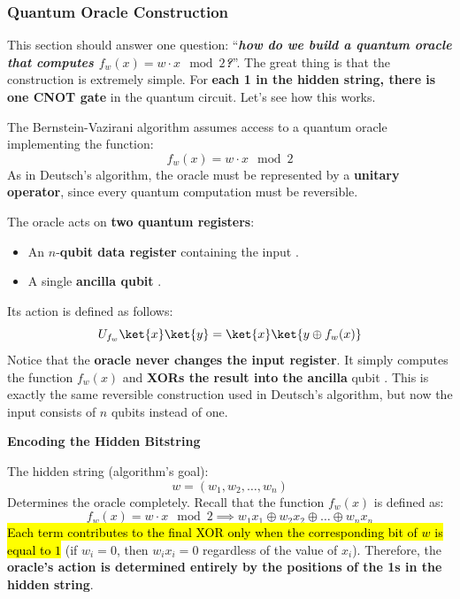 \subsubsection{Quantum Oracle Construction}\label{sec:quantum-oracle-construction}

This section should answer one question: ``\emph{\textbf{how do we build a quantum oracle that computes $f_w (x) = w \cdot x \mod 2$?}}''. The great thing is that the construction is extremely simple. For \textbf{each 1 in the hidden string, there is one CNOT gate} in the quantum circuit. Let's see how this works.

\highspace
The Bernstein-Vazirani algorithm assumes access to a quantum oracle implementing the function:
\begin{equation*}
    f_w (x) = w \cdot x \mod 2
\end{equation*}
As in Deutsch's algorithm, the oracle must be represented by a \textbf{unitary operator}, since every quantum computation must be reversible.

\highspace
The oracle acts on \textbf{two quantum registers}:
\begin{itemize}
    \item An $n$-\textbf{qubit data register} containing the input .
    \item A single \textbf{ancilla qubit} .
\end{itemize}
Its action is defined as follows:
\begin{equation*}
    U_{f_w} \ket{x} \ket{y} = \ket{x} \ket{y \oplus f_w (x)}
\end{equation*}
Notice that the \textbf{oracle never changes the input register}. It simply computes the function $f_w(x)$ and \textbf{XORs the result into the ancilla} qubit . This is exactly the same reversible construction used in Deutsch's algorithm, but now the input consists of $n$ qubits instead of one.

\highspace
\begin{flushleft}
    \textcolor{Green3}{ \textbf{Encoding the Hidden Bitstring}}
\end{flushleft}
The hidden string (algorithm's goal):
\begin{equation*}
    w = \left(w_1, w_2, \ldots, w_n\right)
\end{equation*}
Determines the oracle completely. Recall that the function $f_w(x)$ is defined as:
\begin{equation*}
    f_w (x) = w \cdot x \mod 2 \implies w_1 x_1 \oplus w_2 x_2 \oplus \ldots \oplus w_n x_n
\end{equation*}
\hl{Each term contributes to the final XOR only when the corresponding bit of $w$ is equal to $1$} (if $w_i = 0$, then $w_i x_i = 0$ regardless of the value of $x_i$). Therefore, the \textbf{oracle's action is determined entirely by the positions of the 1s in the hidden string}.

